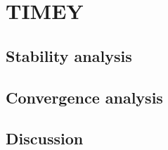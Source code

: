 \section{TIMEY}




%
%

\subsection{Stability analysis}


\subsection{Convergence analysis}

\subsection{Discussion}
